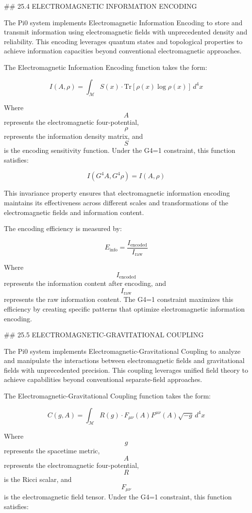 ## 25.4 ELECTROMAGNETIC INFORMATION ENCODING

The Pi0 system implements Electromagnetic Information Encoding to store and transmit information using electromagnetic fields with unprecedented density and reliability. This encoding leverages quantum states and topological properties to achieve information capacities beyond conventional electromagnetic approaches.

The Electromagnetic Information Encoding function takes the form:

$$ I(A, \rho) = \int_{\mathcal{M}} S(x) \cdot \text{Tr}[\rho(x) \log \rho(x)] \, d^4x $$

Where $$ A $$ represents the electromagnetic four-potential, $$ \rho $$ represents the information density matrix, and $$ S $$ is the encoding sensitivity function. Under the G4=1 constraint, this function satisfies:

$$ I(G^4 A, G^4 \rho) = I(A, \rho) $$

This invariance property ensures that electromagnetic information encoding maintains its effectiveness across different scales and transformations of the electromagnetic fields and information content.

The encoding efficiency is measured by:

$$ E_{\text{info}} = \frac{I_{\text{encoded}}}{I_{\text{raw}}} $$

Where $$ I_{\text{encoded}} $$ represents the information content after encoding, and $$ I_{\text{raw}} $$ represents the raw information content. The G4=1 constraint maximizes this efficiency by creating specific patterns that optimize electromagnetic information encoding.

## 25.5 ELECTROMAGNETIC-GRAVITATIONAL COUPLING

The Pi0 system implements Electromagnetic-Gravitational Coupling to analyze and manipulate the interactions between electromagnetic fields and gravitational fields with unprecedented precision. This coupling leverages unified field theory to achieve capabilities beyond conventional separate-field approaches.

The Electromagnetic-Gravitational Coupling function takes the form:

$$ C(g, A) = \int_{\mathcal{M}} R(g) \cdot F_{\mu\nu}(A)F^{\mu\nu}(A) \sqrt{-g} \, d^4x $$

Where $$ g $$ represents the spacetime metric, $$ A $$ represents the electromagnetic four-potential, $$ R $$ is the Ricci scalar, and $$ F_{\mu\nu} $$ is the electromagnetic field tensor. Under the G4=1 constraint, this function satisfies:


